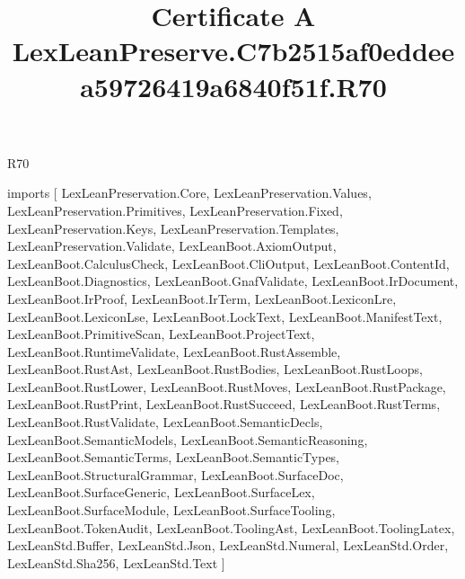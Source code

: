 \begin{lexlean}{R70}
\title{Certificate A LexLeanPreserve.C7b2515af0eddeea59726419a6840f51f.R70}
\begin{coremodule}
imports [
  LexLeanPreservation.Core,
  LexLeanPreservation.Values,
  LexLeanPreservation.Primitives,
  LexLeanPreservation.Fixed,
  LexLeanPreservation.Keys,
  LexLeanPreservation.Templates,
  LexLeanPreservation.Validate,
  LexLeanBoot.AxiomOutput,
  LexLeanBoot.CalculusCheck,
  LexLeanBoot.CliOutput,
  LexLeanBoot.ContentId,
  LexLeanBoot.Diagnostics,
  LexLeanBoot.GnafValidate,
  LexLeanBoot.IrDocument,
  LexLeanBoot.IrProof,
  LexLeanBoot.IrTerm,
  LexLeanBoot.LexiconLre,
  LexLeanBoot.LexiconLse,
  LexLeanBoot.LockText,
  LexLeanBoot.ManifestText,
  LexLeanBoot.PrimitiveScan,
  LexLeanBoot.ProjectText,
  LexLeanBoot.RuntimeValidate,
  LexLeanBoot.RustAssemble,
  LexLeanBoot.RustAst,
  LexLeanBoot.RustBodies,
  LexLeanBoot.RustLoops,
  LexLeanBoot.RustLower,
  LexLeanBoot.RustMoves,
  LexLeanBoot.RustPackage,
  LexLeanBoot.RustPrint,
  LexLeanBoot.RustSucceed,
  LexLeanBoot.RustTerms,
  LexLeanBoot.RustValidate,
  LexLeanBoot.SemanticDecls,
  LexLeanBoot.SemanticModels,
  LexLeanBoot.SemanticReasoning,
  LexLeanBoot.SemanticTerms,
  LexLeanBoot.SemanticTypes,
  LexLeanBoot.StructuralGrammar,
  LexLeanBoot.SurfaceDoc,
  LexLeanBoot.SurfaceGeneric,
  LexLeanBoot.SurfaceLex,
  LexLeanBoot.SurfaceModule,
  LexLeanBoot.SurfaceTooling,
  LexLeanBoot.TokenAudit,
  LexLeanBoot.ToolingAst,
  LexLeanBoot.ToolingLatex,
  LexLeanStd.Buffer,
  LexLeanStd.Json,
  LexLeanStd.Numeral,
  LexLeanStd.Order,
  LexLeanStd.Sha256,
  LexLeanStd.Text
]


\end{coremodule}
\end{lexlean}
